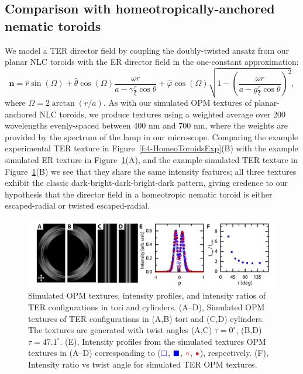 \subsection{Comparison with homeotropically-anchored nematic toroids}
We model a TER director field by coupling the doubly-twisted ansatz from our planar NLC toroids with the ER director field in the one-constant approximation:
\begin{equation}
  \mathbf{n} = \hat{r} \sin(\Omega)
  + \hat{\theta}\cos(\Omega)\frac{\omega r}{a-\gamma \frac{r}{\xi} \cos \theta}
  + \hat{\varphi}\cos(\Omega)\sqrt{1 - \left ( \frac{\omega r}{a-g \frac{r}{\xi} \cos \theta} \right )^2 },\label{e:4-TERansatz}
\end{equation}
where $\Omega = 2 \arctan(r/a)$.
As with our simulated OPM textures of planar-anchored NLC toroids, we produce textures using a weighted average over 200 wavelengths evenly-spaced between $400$ nm and $700$ nm, where the weights are provided by the spectrum of the lamp in our microscope.
Comparing the example experimental TER texture in Figure~\ref{f:4-HomeoToroidsExp}(B) with the example simulated ER texture in Figure~\ref{f:4-I0I45vsTwist}(A), and the example simulated TER texture in Figure~\ref{f:4-I0I45vsTwist}(B) we see that they share the same intensity features; all three textures exhibit the classic dark-bright-dark-bright-dark pattern, giving credence to our hypothesis that the director field in a homeotropic nematic toroid is either escaped-radial or twisted escaped-radial.
\begin{figure}
  \centering
  \includegraphics{figures/C4/Ch4-Figs_I0I45vsTwist.png}
  \caption{Simulated OPM textures, intensity profiles, and intensity ratios of TER configurations in tori and cylinders.
  (A--D), Simulated OPM textures of TER configurations in (A,B) tori and (C,D) cylinders.
  The textures are generated with twist angles (A,C) $\tau = 0^{\circ}$, (B,D) $\tau = 47.1^\circ$.
  (E), Intensity profiles from the simulated textures OPM textures in (A--D) corresponding to (${\color{blue} \square}$, ${\color{blue} \blacksquare}$, ${\color{red} \circ}$, ${\color{red} \bullet}$), respectively.
  (F), Intensity ratio vs twist angle for simulated TER OPM textures.}\label{f:4-I0I45vsTwist}
\end{figure}

